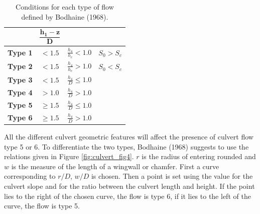 \begin{table}[H]
\caption{Conditions for each type of flow defined by Bodhaine (1968).}\label{tab:culvert_tab1}
\begin{center}\begin{tabular}{|c|c|c|c|}
\hline
~ & $\mathbf{\dfrac{h_1-z}{D}}$ & ~ & ~\\
\hline
\textbf{Type 1} & $<1.5$    &  $\frac{h_4}{h_c} < 1.0$ & $S_0 > S_c$\\
\hline
\textbf{Type 2} & $<1.5$    &  $\frac{h_4}{h_c} > 1.0$ & $S_0 < S_c$\\
\hline
\textbf{Type 3} & $<1.5$    & $\frac{h_4}{D} \le 1.0$ & ~\\
\hline
\textbf{Type 4} & $> 1.0$   & $\frac{h_4}{D} > 1.0$ & ~\\
\hline
\textbf{Type 5} & $\ge 1.5$ & $\frac{h_4}{D} \le 1.0$ & ~\\
\hline
\textbf{Type 6} & $\ge 1.5$ & $\frac{h_4}{D} > 1.0$  & ~\\
\hline
\end{tabular}\end{center}
\end{table}

All the different culvert geometric features will affect the presence of culvert flow type 5 or 6.
To differentiate the two types, Bodhaine (1968) suggests to use the relations given in Figure \ref{fig:culvert_fig4}.
$r$ is the radius of entering rounded and $w$ is the measure of the length of a wingwall
or chamfer. First a curve corresponding to $r/D$, $w/D$ is chosen.
Then a point is set using the value for the culvert slope and for the ratio
between the culvert length and height.
If the point lies to the right of the chosen curve, the flow is type 6,
if it lies to the left of the curve, the flow is type 5.

